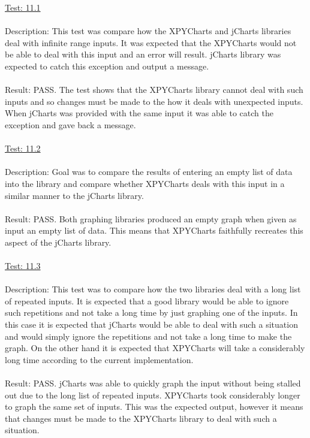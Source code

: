 \documentclass[12pt, titlepage]{article}
\begin{document}
\underline{Test: 11.1}\\\\ \label{sec:11.1}
Description: This test was compare how the XPYCharts and jCharts libraries deal with infinite range inputs. It was expected that the XPYCharts would not be able to deal with this input and an error will result. jCharts library was expected to catch this exception and output a message.\\\\

Result: PASS. The test shows that the XPYCharts library cannot deal with such inputs and so changes must be made to the how it deals with unexpected inputs. When jCharts was provided with the same input it was able to catch the exception and gave back a message.\\\\


\underline{Test: 11.2}\\\\ \label{sec:11.2}
Description:  Goal was to compare the results of entering an empty list of data into the library and compare whether XPYCharts deals with this input in a similar manner to the jCharts library.\\\\

Result: PASS. Both graphing libraries produced an empty graph when given as input an empty list of data. This means that XPYCharts faithfully recreates this aspect of the jCharts library.\\\\

\underline{Test: 11.3}\\\\
Description: This test was to compare how the two libraries deal with a long list of repeated inputs. It is expected that a good library would be able to ignore such repetitions and not take a long time by just graphing one of the inputs. In this case it is expected that jCharts would be able to deal with such a situation and would simply ignore the repetitions and not take a long time to make the graph. On the other hand it is expected that XPYCharts will take a considerably long time according to the current implementation. \\\\

Result: PASS. jCharts was able to quickly graph the input without being stalled out due to the long list of repeated inputs. XPYCharts took considerably longer to graph the same set of inputs. This was the expected output, however it means that changes must be made to the XPYCharts library to deal with such a situation.\\\\
\end{document}
